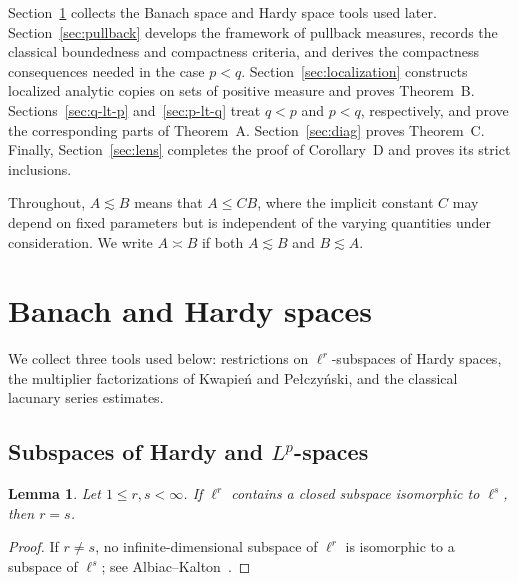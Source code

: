 \documentclass[11pt, reqno]{amsart}
\newtheorem{lemma}[theorem]{Lemma}
\theoremstyle{definition}
\theoremstyle{remark}
\begin{document}
Section~\ref{sec:prelim}
collects the Banach space and Hardy space tools used later.
Section~\ref{sec:pullback} develops the framework of pullback measures,
records the classical boundedness and compactness criteria, and derives
the compactness consequences needed in the case \(p<q\). Section~\ref{sec:localization} constructs
localized analytic copies on sets of positive measure and proves
Theorem~B. Sections~\ref{sec:q-lt-p} and~\ref{sec:p-lt-q}
treat \(q<p\) and \(p<q\), respectively, and prove the corresponding
parts of Theorem~A. Section~\ref{sec:diag} proves Theorem~C.
Finally, Section~\ref{sec:lens} completes the proof of
Corollary~D and proves its strict inclusions.

Throughout, \(A\lesssim B\) means that \(A\le CB\), where the implicit constant \(C\) may depend on fixed parameters but is independent of the varying quantities under consideration.  We write
\(A\asymp B\) if both \(A\lesssim B\) and \(B\lesssim A\).



\section{Banach and Hardy spaces}
\label{sec:prelim}

We collect three tools used below: restrictions on
\(\ell^r\)-subspaces of Hardy spaces, the multiplier factorizations
of Kwapie\'n and Pe{\l}czy\'nski, and the classical lacunary series
estimates.
 

\subsection{\texorpdfstring{Subspaces of Hardy and \(L^p\)-spaces} 
{Subspaces of Hardy and Lp-spaces}}

\begin{lemma}
\label{lem:ellr-rigidity}
Let \(1\le r,s<\infty\). If \(\ell^r\) contains a closed subspace
isomorphic to \(\ell^s\), then \(r=s\).
\end{lemma}

\begin{proof}
If \(r\ne s\), no infinite-dimensional subspace of \(\ell^r\) is
isomorphic to a subspace of \(\ell^s\); see
Albiac--Kalton~\cite[Corollary~2.1.6]{AlbiacKalton2016}.
\end{proof}
\end{document}

